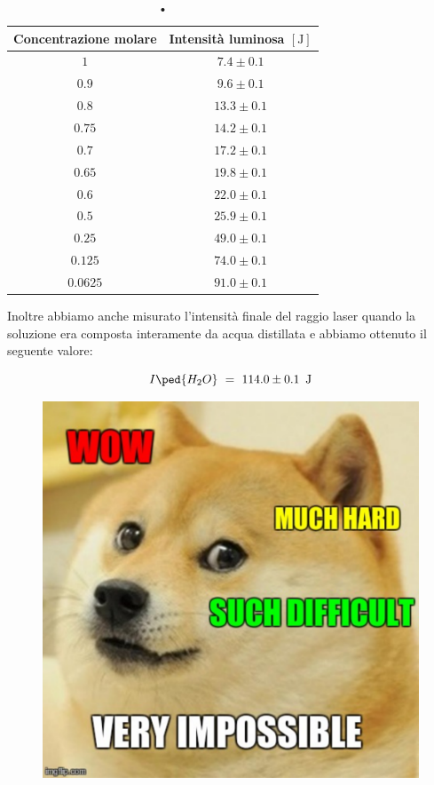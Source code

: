 \begin{table}[t!]
    \centering
    \begin{tabular}{c c }
        \toprule
         Concentrazione molare & Intensità luminosa $[\si{\joule}]$ \\
        \midrule
		$1$ 	& $7.4 \pm 0.1$ \\
		$0.9$ 	& $9.6 \pm 0.1$ \\       
        $0.8$ 	& $13.3 \pm 0.1$ \\
        $0.75$ 	& $14.2 \pm 0.1$ \\
        $0.7$ 	& $17.2 \pm 0.1$ \\
        $0.65$ 	& $19.8 \pm 0.1$ \\
        $0.6$ 	& $22.0 \pm 0.1$ \\
        $0.5$ 	& $25.9 \pm 0.1$ \\
        $0.25$ 	& $49.0 \pm 0.1$ \\
        $0.125$ & $74.0 \pm 0.1$ \\
        $0.0625$ & $91.0 \pm 0.1$ \\
        \bottomrule
    \end{tabular}
    \caption{•}
    \label{tab:dati}
\end{table}
%
Inoltre abbiamo anche misurato l'intensità finale del raggio laser quando la soluzione era composta interamente da acqua distillata e abbiamo ottenuto il seguente valore:

\begin{equation*}
	I\ped{H_2O} \,\,=\,\, 114.0 \pm 0.1 \,\,\, \si{\joule}
\end{equation*}

\begin{figure}[hbtp]
        \centering
        \includegraphics[scale=0.43]{doge.pdf}
        \end{figure}